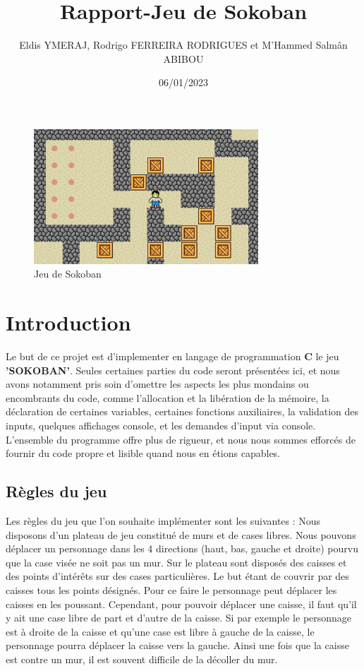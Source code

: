 \documentclass[12pt,french]{article}
\title{Rapport-Jeu de Sokoban}
\author{Eldis YMERAJ, Rodrigo FERREIRA RODRIGUES et M'Hammed Salmân ABIBOU}
\date{06/01/2023}
\begin{document}
\maketitle

\begin{figure}[h]
    \centering
    \includegraphics[width=0.75\textwidth]{sokoban-1735.jpg}
    \caption{Jeu de Sokoban}
    
\end{figure}

\newpage

\tableofcontents

\newpage

\section*{Introduction}


Le but de ce projet est d'implementer en langage de programmation \textbf{C} le jeu \textbf{'SOKOBAN'}.
\newline
Seules certaines parties du code seront présentées ici, et nous avons notamment pris soin d'omettre les aspects les plus mondains ou encombrants du code, comme l’allocation et la libération de la mémoire, la déclaration de certaines variables, certaines fonctions
auxiliaires, la validation des inputs, quelques affichages console, et les demandes d’input via console. L’ensemble du programme offre plus de rigueur, et nous nous sommes efforcés de fournir du code propre et lisible quand nous en étions capables.

\subsection{Règles du jeu}
Les règles du jeu que l’on souhaite implémenter sont les suivantes :
Nous disposons d’un plateau de jeu constitué de murs et de cases libres. Nous pouvons déplacer un personnage dans les 4 directions (haut, bas, gauche et droite) pourvu que la case visée ne soit pas un mur.
Sur le plateau sont disposés des caisses et des points d’intérêts sur des cases particulières. Le but étant de couvrir par des caisses tous les points désignés. Pour ce faire le personnage peut déplacer les caisses en les poussant. Cependant, pour pouvoir déplacer une caisse, il faut qu’il y ait une case libre de part et d’autre de la caisse. Si par exemple le personnage est à droite de la caisse et qu’une case est libre à gauche de la caisse, le personnage pourra déplacer la caisse vers la gauche. Ainsi une fois que la caisse est contre un mur, il est souvent difficile de la décoller du mur.
\end{document}
